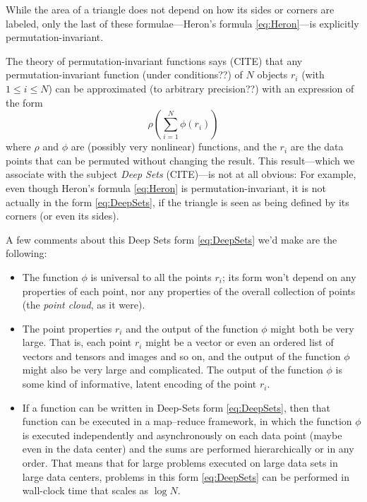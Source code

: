\documentclass[12pt]{article}
\begin{document}
While the area of a triangle does not depend on how its sides or corners are labeled,
only the last of these formulae---Heron's formula \eqref{eq:Heron}---is explicitly permutation-invariant.

The theory of permutation-invariant functions says (CITE) that any per\-mu\-tation-invariant function (under conditions??) of $N$ objects $r_i$ (with $1\leq i\leq N$) can be approximated (to arbitrary precision??) with an expression of the form
\begin{equation}
    \rho(\sum_{i=1}^N\phi(r_i)) \label{eq:DeepSets}
\end{equation}
where $\rho$ and $\phi$ are (possibly very nonlinear) functions,
and the $r_i$ are the data points that can be permuted without changing the result.
This result---which we associate with the subject \emph{Deep Sets} (CITE)---is not at all obvious:
For example, even though Heron's formula \eqref{eq:Heron} is permutation-invariant, it is not actually in the form \eqref{eq:DeepSets}, if the triangle is seen as being defined by its corners (or even its sides).

A few comments about this Deep Sets form \eqref{eq:DeepSets} we'd make are the following:
\begin{itemize}
    \item The function $\phi$ is universal to all the points $r_i$; its form won't depend on any properties of each point, nor any properties of the overall collection of points (the \emph{point cloud}, as it were).
    \item The point properties $r_i$ and the output of the function $\phi$ might both be very large.
    That is, each point $r_i$ might be a vector or even an ordered list of vectors and tensors and images and so on, and the output of the function $\phi$ might also be very large and complicated.
    The output of the function $\phi$ is some kind of informative, latent encoding of the point $r_i$.
    \item If a function can be written in Deep-Sets form \eqref{eq:DeepSets}, then that function can be executed in a map--reduce framework, in which the function $\phi$ is executed independently and asynchronously on each data point (maybe even in the data center) and the sums are performed hierarchically or in any order.
    That means that for large problems executed on large data sets in large data centers, problems in this form \eqref{eq:DeepSets} can be performed in wall-clock time that scales as $\log N$.
\end{itemize}
\end{document}
